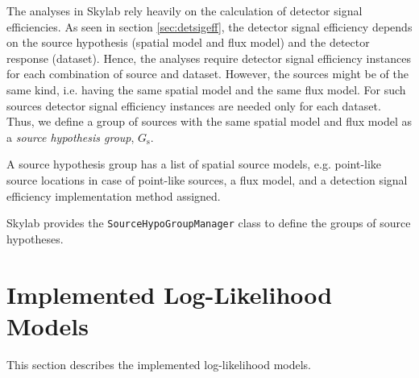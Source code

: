 \documentclass{article}
\newcommand{\code}[1]{\texttt{#1}}
\newcommand{\class}[1]{\colorbox{blue!30}{\code{#1}}}
\begin{document}
The analyses in Skylab rely heavily on the calculation of detector signal
efficiencies. As seen in section \ref{sec:detsigeff}, the detector signal
efficiency depends on the source hypothesis (spatial model and flux model)
and the detector response (dataset). Hence, the analyses require detector signal
efficiency instances for each combination of source and dataset.
However, the sources might be of the same kind, i.e. having the same spatial
model and the same flux model. For such sources detector signal efficiency
instances are needed only for each dataset. Thus, we define a group
of sources with the same spatial model and flux model as a \emph{source hypothesis group},
$G_{\mathrm{s}}$.

A source hypothesis group has a list of spatial source models, e.g. point-like source
locations in case of point-like sources, a flux model, and a detection signal
efficiency implementation method assigned.

Skylab provides the \class{SourceHypoGroupManager} class to define the groups of
source hypotheses.

\section{Implemented Log-Likelihood Models}
This section describes the implemented log-likelihood models. \cite{TimeDepPSSearchMethods2010}

%
%



\end{document}
